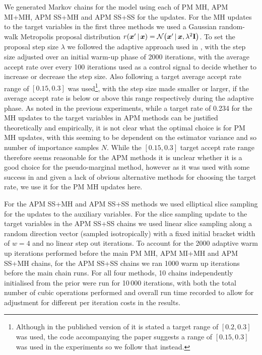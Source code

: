 We generated Markov chains for the model using each of \ac{PM} \ac{MH}, \ac{APM} \ac{MI}+\ac{MH}, \ac{APM} \ac{SS}+\ac{MH} and \ac{APM} \ac{SS}+\ac{SS} for the updates. For the \ac{MH} updates to the target variables in the first three methods we used a Gaussian random-walk Metropolis proposal distribution $r(\vct{x}'\gvn\vct{x}) = \nrm{\vct{x}'\gvn\vct{x},\lambda^2\mathbf{I}}$. To set the proposal step size $\lambda$ we followed the adaptive approach used in \citep{filippone2014pseudo}, with the step size adjusted over an initial warm-up phase of 2000 iterations, with the average accept rate over every 100 iterations used as a control signal to decide whether to increase or decrease the step size. Also following \citep{filippone2014pseudo} a target average accept rate range of $[0.15,0.3]$ was used\footnote{Although in the published version of \citep{filippone2014pseudo} it is stated a target range of $[0.2,0.3]$ was used, the code accompanying the paper suggests a range of $[0.15,0.3]$ was used in the experiments so we follow that instead.}, with the step size made smaller or larger, if the average accept rate is below or above this range respectively during the adaptive phase. As noted in the previous experiments, while a target rate of 0.234 for the \ac{MH} updates to the target variables in \ac{APM} methods can be justified theoretically and empirically, it is not clear what the optimal choice is for \ac{PM} \ac{MH} updates, with this seeming to be dependent on the estimator variance and so number of importance samples $N$. While the $[0.15,0.3]$ target accept rate range therefore seems reasonable for the \ac{APM} methods it is unclear whether it is a good choice for the pseudo-marginal method, however as it was used with some success in \citep{filippone2014pseudo} and given a lack of obvious alternative methods for choosing the target rate, we use it for the \ac{PM} \ac{MH} updates here.

For the \ac{APM} \ac{SS}+\ac{MH} and \ac{APM} \ac{SS}+\ac{SS} methods we used elliptical slice sampling for the updates to the auxiliary variables. For the slice sampling update to the target variables in the \ac{APM} \ac{SS}+\ac{SS} chains we used linear slice sampling along a random direction vector (sampled isotropically) with a fixed initial bracket width of $w=4$ and no linear step out iterations. To account for the 2000 adaptive warm up iterations performed before the main \ac{PM} \ac{MH}, \ac{APM} \ac{MI}+\ac{MH} and \ac{APM} \ac{SS}+\ac{MH} chains, for the \ac{APM} \ac{SS}+\ac{SS} chains we ran 1000 warm up iterations before the main chain runs. For all four methods, 10 chains independently initialised from the prior were run for 10\,000 iterations, with both the total number of cubic operations performed and overall run time recorded to allow for adjustment for different per iteration costs in the results.


